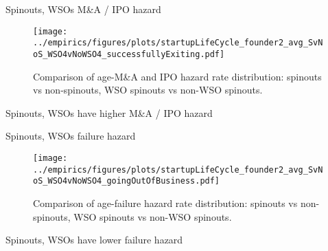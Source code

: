 \documentclass[english,usenames,dvipsnames]{beamer}
\begin{document}
\begin{frame}{Spinouts, WSOs M\&A / IPO hazard}
\begin{figure}
	\centering
	\texttt{[image: ../empirics/figures/plots/startupLifeCycle\_founder2\_avg\_SvNoS\_WSO4vNoWSO4\_successfullyExiting.pdf]}
	\caption{Comparison of age-M\&A and IPO hazard rate distribution: spinouts vs non-spinouts, WSO spinouts vs non-WSO spinouts.}
\end{figure}
\end{frame}

\begin{frame}{Spinouts, WSOs have higher M\&A / IPO hazard}
\begin{table}
\tiny
\centering

\caption{\footnotesize The regresssions above compare the \textbf{M\&A and IPO hazard rate} in WSO4 spinouts, non-WSO4 spinouts and non-spinouts. The first regression uses no controls. The following three regressions in addition control for year effects, age effects, and / or cohort effects, in each case allowing the relevant effect to differ by State-NAICS4 combination. Standard errors are multi-way clustered at the state, NAICS4 and year levels.}
\end{table}
\end{frame}

\begin{frame}{Spinouts, WSOs failure hazard}
\begin{figure}
	\centering
	\texttt{[image: ../empirics/figures/plots/startupLifeCycle\_founder2\_avg\_SvNoS\_WSO4vNoWSO4\_goingOutOfBusiness.pdf]}
	\caption{Comparison of age-failure hazard rate distribution: spinouts vs non-spinouts, WSO spinouts vs non-WSO spinouts.}
\end{figure}
\end{frame}

\begin{frame}{Spinouts, WSOs have lower failure hazard}
\begin{table}
\tiny
\centering

\caption{\footnotesize The regresssions above compare the \textbf{failure rate} in WSO4 spinouts, non-WSO4 spinouts and non-spinouts. The first regression uses no controls. The following three regressions in addition control for year effects, age effects, and / or cohort effects, in each case allowing the relevant effect to differ by State-NAICS4 combination. Standard errors are multi-way clustered at the state, NAICS4 and year levels.}
\end{table}
\end{frame}
\end{document}
